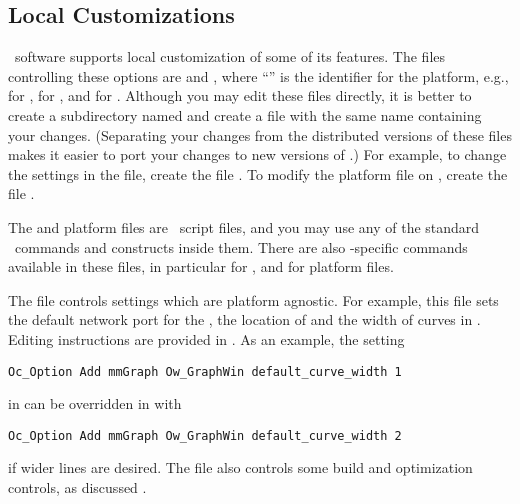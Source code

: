 \subsection{Local Customizations}\label{sec:install.custom}
\OOMMF\ software supports local customization of some of its
features. The files controlling these options are
 and
, where
``'' is the identifier for the platform, e.g.,
 for \Windows,  for \Linux, and
 for \MacOSX. Although you may edit these files directly, it
is better to create a subdirectory named  and
create a file with the same name containing your changes. (Separating
your changes from the distributed versions of these files makes it
easier to port your changes to new versions of \OOMMF.)  For example, to
change the settings in the  file, create the file
. To modify the platform file on \Windows,
create the file .

The  and platform files are \Tcl\ script files, and you
may use any of the standard \Tcl\ commands and constructs inside
them. There are also \OOMMF-specific commands available in these files,
in particular  for , and  for platform files.

The  file controls settings which are platform agnostic.
For example, this file sets the default network port for the
, the location of
 and the width of curves in
.
Editing instructions are provided in . As an example,
the setting
\begin{verbatim}
Oc_Option Add mmGraph Ow_GraphWin default_curve_width 1
\end{verbatim}
in  can be overridden in  with
\begin{verbatim}
Oc_Option Add mmGraph Ow_GraphWin default_curve_width 2
\end{verbatim}
if wider lines are desired. The  file also controls some
build and optimization controls, as discussed
.

